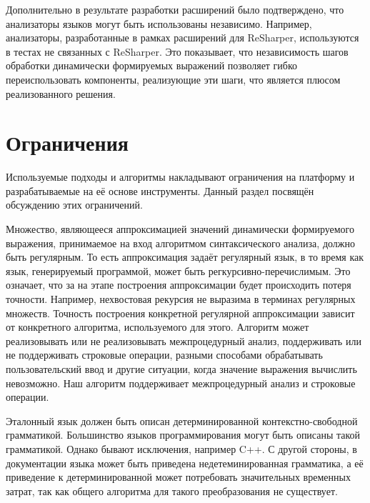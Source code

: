 Дополнительно в результате разработки расширений было подтверждено, что анализаторы языков могут быть использованы независимо. Например, анализаторы, разработанные в рамках расширений для ReSharper, используются в тестах не связанных с ReSharper. Это показывает, что независимость шагов обработки динамически формируемых выражений позволяет гибко переиспользовать компоненты, реализующие эти шаги, что является плюсом реализованного решения.

\section{Ограничения}

Используемые подходы и алгоритмы накладывают ограничения на платформу и разрабатываемые на её основе инструменты. Данный раздел посвящён обсуждению этих ограничений.

Множество, являющееся аппроксимацией значений динамически формируемого выражения, принимаемое на вход алгоритмом синтаксического анализа, должно быть регулярным. То есть аппроксимация задаёт регулярный язык, в то время как язык, генерируемый программой, может быть регкурсивно-перечислимым. Это означает, что за на этапе построения аппроксимации будет происходить потеря точности. Например, нехвостовая рекурсия не выразима в терминах регулярных множеств. Точность построения конкретной регулярной аппроксимации зависит от конкретного алгоритма, используемого для этого. Алгоритм может реализовывать или не реализовывать межпроцедурный анализ, поддерживать или не поддерживать строковые операции, разными способами обрабатывать пользовательский ввод и другие ситуации, когда значение выражения вычислить невозможно. Наш алгоритм поддерживает межпроцедурный анализ и строковые операции. 

Эталонный язык должен быть описан детерминированной контекстно-свободной грамматикой. Большинство языков программирования могут быть описаны такой грамматикой. Однако бывают исключения, например C++. С другой стороны, в документации языка может быть приведена недетеминированная грамматика, а её приведение к детерминированной может потребовать значительных временных затрат, так как общего алгоритма для такого преобразования не существует. 

